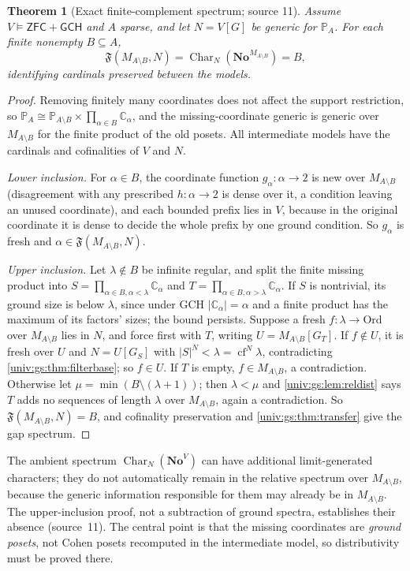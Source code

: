 \documentclass[11pt,letterpaper]{article}
\numberwithin{equation}{section}
\newtheorem{theorem}{Theorem}[section]
\theoremstyle{definition}
\theoremstyle{remark}
\newcommand{\No}{\mathbf{No}}
\newcommand{\Ord}{\mathrm{Ord}}
\newcommand{\cf}{\operatorname{cf}}
\newcommand{\ZFC}{\mathsf{ZFC}}
\newcommand{\abs}[1]{\lvert#1\rvert}
\newcommand{\Char}{\operatorname{Char}}
\newcommand{\FF}{\mathfrak F}
\newcommand{\GCH}{\mathsf{GCH}}
\begin{document}
\begin{theorem}[Exact finite-complement spectrum; source 11]\label{univ:gs:thm:finitecomplement}
Assume $V\models\ZFC+\GCH$ and $A$ sparse, and let $N=V[G]$ be generic for $\mathbb P_A$.
For each finite nonempty $B\subseteq A$,
\[
 \FF(M_{A\setminus B},N)=\Char_N(\No^{M_{A\setminus B}})=B,
\]
identifying cardinals preserved between the models.
\end{theorem}
\begin{proof}
Removing finitely many coordinates does not affect the support restriction, so
$\mathbb P_A\cong\mathbb P_{A\setminus B}\times\prod_{\alpha\in B}\mathbb C_\alpha$, and the
missing-coordinate generic is generic over $M_{A\setminus B}$ for the finite product of
the old posets. All intermediate models have the cardinals and cofinalities of $V$ and
$N$.

\emph{Lower inclusion.} For $\alpha\in B$, the coordinate function $g_\alpha:\alpha\to2$
is new over $M_{A\setminus B}$ (disagreement with any prescribed $h:\alpha\to2$ is dense
over it, a condition leaving an unused coordinate), and each bounded prefix lies in $V$,
because in the original coordinate it is dense to decide the whole prefix by one ground
condition. So $g_\alpha$ is fresh and $\alpha\in\FF(M_{A\setminus B},N)$.

\emph{Upper inclusion.} Let $\lambda\notin B$ be infinite regular, and split the finite
missing product into $S=\prod_{\alpha\in B,\alpha<\lambda}\mathbb C_\alpha$ and
$T=\prod_{\alpha\in B,\alpha>\lambda}\mathbb C_\alpha$. If $S$ is nontrivial, its ground
size is below $\lambda$, since under GCH $\abs{\mathbb C_\alpha}=\alpha$ and a finite
product has the maximum of its factors' sizes; the bound persists. Suppose a fresh
$f:\lambda\to\Ord$ over $M_{A\setminus B}$ lies in $N$, and force first with $T$, writing
$U=M_{A\setminus B}[G_T]$. If $f\notin U$, it is fresh over $U$ and $N=U[G_S]$ with
$\abs S^N<\lambda=\cf^N\lambda$, contradicting \cref{univ:gs:thm:filterbase}; so
$f\in U$. If $T$ is empty, $f\in M_{A\setminus B}$, a contradiction. Otherwise let
$\mu=\min(B\setminus(\lambda+1))$; then $\lambda<\mu$ and \cref{univ:gs:lem:reldist}
says $T$ adds no sequences of length $\lambda$ over $M_{A\setminus B}$, again a
contradiction. So $\FF(M_{A\setminus B},N)=B$, and cofinality preservation and
\cref{univ:gs:thm:transfer} give the gap spectrum.
\end{proof}

The ambient spectrum $\Char_N(\No^V)$ can have additional limit-generated characters;
they do not automatically remain in the relative spectrum over $M_{A\setminus B}$,
because the generic information responsible for them may already be in
$M_{A\setminus B}$. The upper-inclusion proof, not a subtraction of ground spectra,
establishes their absence (source~11). The central point is that the missing
coordinates are \emph{ground posets}, not Cohen posets recomputed in the intermediate
model, so distributivity must be proved there.
\end{document}
